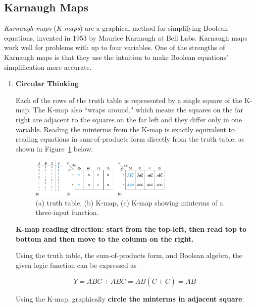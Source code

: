 \documentclass[12pt]{article}
\begin{document}
\subsection{Karnaugh Maps}

\textit{Karnaugh maps} (\textit{K-maps}) are a graphical method for simplifying Boolean equations, invented in 1953 by Maurice Karnaugh at Bell Labs. Karnaugh maps work well for problems with up to four variables. One of the strengths of Karnaugh maps is that they use the intuition to make Boolean equations' simplification more accurate.

\begin{enumerate}
    \item \textbf{Circular Thinking}

    Each of the rows of the truth table is represented by a single square of the K-map. The K-map also ``wraps around," which means the squares on the far right are adjacent to the squares on the far left and they differ only in one variable. Reading the minterms from the K-map is exactly equivalent to reading equations in sum-of-products form directly from the truth table, as shown in Figure~\ref{figure:5} below:

    \begin{figure}
        \centering
        \includegraphics[width=0.65\textwidth]{truth_table_karnaugh_map.png}
        \caption{(a) truth table, (b) K-map, (c) K-map showing minterms of a three-input function.}
        \label{figure:5}
    \end{figure}

    \textbf{K-map reading direction: start from the top-left, then read top to bottom and then move to the column on the right.}

    Using the truth table, the sum-of-products form, and Boolean algebra, the given logic function can be expressed as

    \begin{equation} \label{equation:7}
        Y = \bar{A}\bar{B}\bar{C} + \bar{A}\bar{B}C = \bar{A}\bar{B}(\bar{C} + C) = \bar{A}\bar{B}
    \end{equation}

    Using the K-map, graphically \textbf{circle the minterms in adjacent square}:


\end{enumerate}
\end{document}

